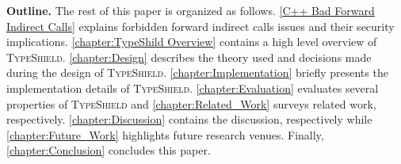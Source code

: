 \label{Outline}
\textbf{Outline.} The rest of this paper is organized as follows.
\cref{C++ Bad Forward Indirect Calls} explains forbidden forward indirect calls issues and their security implications.
\cref{chapter:TypeShild Overview} contains a high level overview of \textsc{TypeShield}.
\cref{chapter:Design} describes the theory used and decisions made during the design of \textsc{TypeShield}.
\cref{chapter:Implementation} briefly presents the implementation details of \textsc{TypeShield}.
\cref{chapter:Evaluation} evaluates several properties of \textsc{TypeShield} and
\cref{chapter:Related_Work} surveys related work, respectively.
\cref{chapter:Discussion} contains the discussion, respectively while 
\cref{chapter:Future_Work} highlights future research venues. 
Finally, \cref{chapter:Conclusion} concludes this paper.


